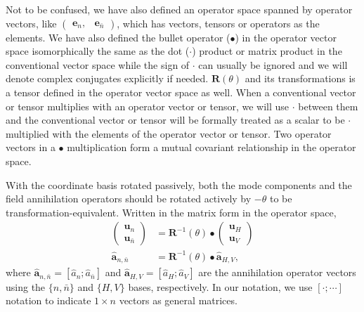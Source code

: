 \documentclass[preprint,aps,pra,onecolumn,superscriptaddress]{revtex4-1} %
\begin{document}
\begin{appendix}
Not to be confused, we have also defined an operator space spanned by operator vectors, like $ \left(\!\begin{array}{cc}\mathbf{e}_n,&\mathbf{e}_{\bar{n}}\end{array}\! \right) $, which has vectors, tensors or operators as the elements.
We have also defined the bullet operator ($ \bullet $) in the operator vector space isomorphically the same as the dot ($ \cdot $) product or matrix product in the conventional vector space while the sign of $ \cdot $ can usually be ignored and we will denote complex conjugates explicitly if needed. 
$ \mathbf{R}(\theta) $ and its transformations is a tensor defined in the operator vector space as well.
When a conventional vector or tensor multiplies with an operator vector or tensor, we will use $ \cdot $ between them and the conventional vector or tensor will be formally treated as a scalar to be $ \cdot $ multiplied with the elements of the operator vector or tensor. 
Two operator vectors in a $ \bullet $ multiplication form a mutual covariant relationship in the operator space.
 
With the coordinate basis rotated passively, both the mode components and the field annihilation operators should be rotated actively by $ -\theta $ to be transformation-equivalent.
Written in the matrix form in the operator space, 
\begin{align}
\left(\!\begin{array}{c}\mathbf{u}_n \\ \mathbf{u}_{\bar{n}}\end{array}\!\right) &= \mathbf{R}^{-1}(\theta)\bullet\left(\!\begin{array}{c}\mathbf{u}_H \\ \mathbf{u}_V\end{array}\!\right)\\
\hat{\mathbf{a}}_{n,\bar{n}} &=\mathbf{R}^{-1}(\theta)\bullet \hat{\mathbf{a}}_{H,V},
\end{align}
where $ \hat{\mathbf{a}}_{n,\bar{n}}=[\hat{a}_n;\hat{a}_{\bar{n}}] $ and $ \hat{\mathbf{a}}_{H,V}=[\hat{a}_H;\hat{a}_V] $ are the annihilation operator vectors using the $ \{n,\bar{n} \} $ and $ \{H,V \} $ bases, respectively.
In our notation, we use $ [\cdot ;\cdots] $ notation to indicate $ 1\times n $ vectors as general matrices.


\end{appendix}
\end{document}
